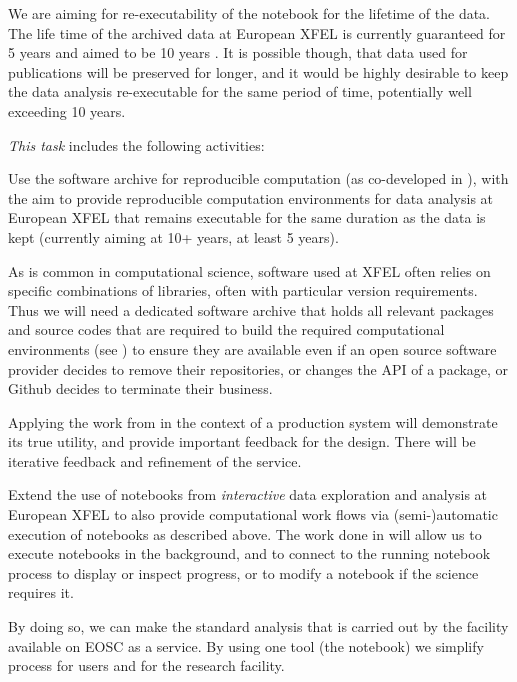 \begin{task}[
  title=Reproducible X-ray crystallography workflows at European XFEL,
  id=reproducibility-xfel,
  lead=XFEL,
  PM=36,
  wphases={6-48},
  partners={XFEL}
  ]
  We are aiming for re-executability of the notebook for the lifetime
  of the data. The life time of the archived data at European XFEL is
  currently guaranteed for 5 years and aimed to be 10 years
  \cite{EuXFEL-datapolicy-2017}. It is possible though, that data used
  for publications will be preserved for longer, and it would be
  highly desirable to keep the data analysis re-executable for the
  same period of time, potentially well exceeding 10 years.

  \medskip \emph{This task} includes the following activities:
  \begin{compactitem}
  \item Use the software archive for reproducible computation
    (as co-developed in ), with
    the aim to provide reproducible computation environments for data analysis at
    European XFEL that remains executable for the same duration as the
    data is kept (currently aiming at 10+ years, at least 5 years).

    As is common in computational science, software used at XFEL often
    relies on specific combinations of libraries, often with
    particular version requirements. Thus we will need a dedicated
    software archive that holds all relevant packages and source codes
    that are required to build the required computational environments
    (see ) to ensure they are
    available even if an open source software provider decides to
    remove their repositories, or changes the API of a package, or
    Github decides to terminate their business.

    Applying the work from  in the
    context of a production system will demonstrate its true utility,
    and provide important feedback for the design. There will be
    iterative feedback and refinement of the service.

  \item Extend the use of notebooks from \emph{interactive} data
    exploration and analysis at European XFEL to also provide
    computational work flows via (semi-)automatic execution of
    notebooks as described above. The work done in
     will allow us to execute notebooks in
    the background, and to connect to the running notebook process to
    display or inspect progress, or to modify a notebook if the
    science requires it.

    By doing so, we can make the standard analysis that is carried out
    by the facility available on EOSC as a service. By using one tool
    (the notebook) we simplify process for users and for the research
    facility.


\end{compactitem}
\end{task}
